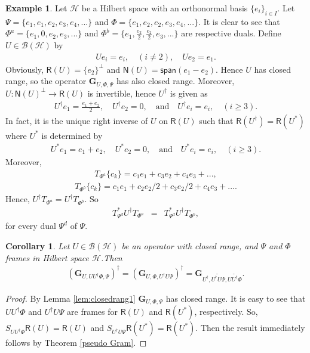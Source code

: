 \documentclass{birkjour}
\newtheorem{cor}[thm]{Corollary}
\theoremstyle{definition}
\newtheorem{ex}[thm]{Example}
\theoremstyle{remark}
\numberwithin{equation}{section}
\newcommand{\range}[1]{\mathsf{R}\left( #1 \right)}
\newcommand{\kernel}[1]{\mathsf{N}\left( #1 \right)}
\newcommand{\finspan}[1]{\mathsf{span}\left( #1 \right)}
\newcommand{\BL}[1]{
{\mathcal B} \left( #1 \right)
}
\begin{document}
\begin{ex} Let $\mathcal{H}$ be a Hilbert space with an orthonormal basis $\{e_i\}_{i\in I}$. Let
 $\Psi=\{e_1,e_1,e_2,e_3,e_4,...\}$ and $\Phi=\{e_1,e_2,e_2,e_3,e_4,...\}$. It is clear to see that $\Phi^{a}=\{e_1,0,e_2,e_3,...\}$ and $\Phi^{b}=\{e_1,\frac{e_2}{2},\frac{e_2}{2},e_3,...\}$ are respective duals.
Define  $U\in \BL{\mathcal{H}}$ by
\begin{eqnarray*}
Ue_{i}=e_i, \quad(i\neq 2),\quad Ue_2=e_1.
\end{eqnarray*}
Obviously, $\range{U}=\{e_2\}^{\perp}$ and $\kernel{U}=\finspan{e_1-e_2}$. Hence $U$ has closed
range, so the operator $\mathbf{G}_{U,\Phi,\Psi}$ has also closed
range. Moreover, $U:\kernel{U}^\perp\rightarrow \range{U}$ is invertible, hence $U^\dag$ is given as
\begin{eqnarray*}
U^{\dag}e_{1}=\frac{e_1+e_2}{2},\quad U^{\dag}e_{2}=0,\quad \textrm{and}\quad U^{\dag}e_{i}=e_i, \quad(i\geq 3).
\end{eqnarray*}
In fact,  it is the unique right
inverse of $U$ on $\range{U}$ such that $\range{U^{\dag}}= \range{U^*}$ where $U^*$ is determined by 
\begin{eqnarray*}
U^*e_{1}=e_1+e_2,\quad U^*e_{2}=0,\quad \textrm{and}\quad U^*e_{i}=e_i, \quad(i\geq 3).
\end{eqnarray*}
Moreover,
\begin{eqnarray*}
T_{\Phi^{a}}\{c_k\}=c_1e_1+c_3e_2+c_4e_3+...,
\end{eqnarray*}
\begin{eqnarray*}
T_{\Phi^{b}}\{c_k\}=c_1e_1+c_2e_2/2+c_3e_2/2+c_4e_3+....
\end{eqnarray*}
Hence, $U^{\dag}T_{\Phi^{a}}=U^{\dag}T_{\Phi^{b}}$. So
\begin{eqnarray*}
T_{\Psi^{d}}^*U^{\dag}T_{\Phi^{a}}&=&T_{\Psi^{d}}^*U^{\dag}T_{\Phi^{b}},
\end{eqnarray*}
for every dual $\Psi^{d}$ of $\Psi$. \end{ex}


\begin{cor} Let $U\in \BL{\mathcal{H}}$ be an operator with closed range, and $\Psi$ and $\Phi$  frames in Hilbert space
$\mathcal{H}$.Then 
\begin{eqnarray*}
\left(\mathbf{G}_{U,UU^{\dagger}\Phi,\Psi}\right)^{\dagger}=\left(\mathbf{G}_{U,\Phi,U^{\dagger}U\Psi}\right)^{\dagger}=\mathbf{G}_{U^{\dag},\widetilde{U^{\dagger}U\Psi},\widetilde{UU^{\dagger}\Phi}}.
\end{eqnarray*}
\end{cor}
\begin{proof} By Lemma \ref{lem:closedrang1} $\mathbf{G}_{U,\Phi,\Psi}$ has closed range. 
It is easy to see that $UU^{\dagger}\Phi$ and $U^{\dagger}U\Psi$ are frames  for $\range U$  and $\range{U^*}$, respectively. So, $S_{UU^{\dagger}\Phi}\range U=\range U$ and $S_{U^{\dagger}U\Psi}\range{U^*}
=\range{U^*}$. Then the result immediately follows by Theorem \ref{pseudo Gram}.
\end{proof}
\end{document}
